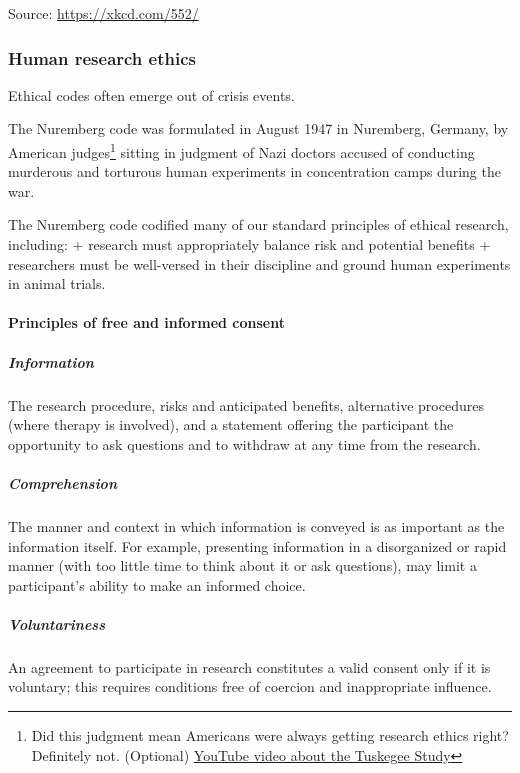 \documentclass[
  openany]{book}
\begin{document}
Source: \url{https://xkcd.com/552/}

\hypertarget{human-research-ethics}{%
\subsubsection{Human research ethics}\label{human-research-ethics}}

Ethical codes often emerge out of crisis events.

The Nuremberg code was formulated in August 1947 in Nuremberg, Germany, by American judges\footnote{Did this judgment mean Americans were always getting research ethics right? Definitely not. (Optional) \href{https://www.youtube.com/watch?v=afwK2CVpc9E}{YouTube video about the Tuskegee Study}} sitting in judgment of Nazi doctors accused of conducting murderous and torturous human experiments in concentration camps during the war.

The Nuremberg code codified many of our standard principles of ethical research, including:
+ research must appropriately balance risk and potential benefits
+ researchers must be well-versed in their discipline and ground human experiments in animal trials.

\hypertarget{principles-of-free-and-informed-consent}{%
\paragraph{Principles of free and informed consent}\label{principles-of-free-and-informed-consent}}

\hypertarget{information}{%
\subparagraph{Information}\label{information}}

The research procedure, risks and anticipated benefits, alternative procedures (where therapy is involved), and a statement offering the participant the opportunity to ask questions and to withdraw at any time from the research.

\hypertarget{comprehension}{%
\subparagraph{Comprehension}\label{comprehension}}

The manner and context in which information is conveyed is as important as the information itself. For example, presenting information in a disorganized or rapid manner (with too little time to think about it or ask questions), may limit a participant's ability to make an informed choice.

\hypertarget{voluntariness}{%
\subparagraph{Voluntariness}\label{voluntariness}}

An agreement to participate in research constitutes a valid consent only if it is voluntary; this requires conditions free of coercion and inappropriate influence.
\end{document}
